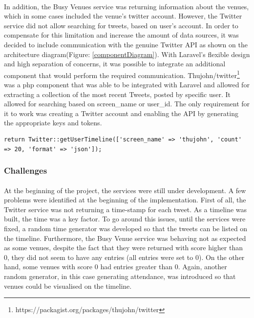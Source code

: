 \documentclass{l4proj}
\begin{document}
\paragraph{}
In addition, the Busy Venues service was returning information about the venues, which in some cases included the venue's twitter account. However, the Twitter service did not allow searching for tweets, based on user's account. In order to compensate for this limitation and increase the amount of data sources, it was decided to include communication with the genuine Twitter API as shown on the architecture diagram(Figure: \ref{componentDiagram}). With Laravel's flexible design and high separation of concerns, it was possible to integrate an additional component that would perform the required communication. Thujohn/twitter\footnote{https://packagist.org/packages/thujohn/twitter} was a php component that was able to be integrated with Laravel and allowed for extracting a collection of the most recent Tweets, posted by specific user. It allowed for searching based on screen\_name or user\_id. The only requirement for it to work was creating a Twitter account and enabling the API by generating the appropriate keys and tokens. 
\begin{lstlisting}
return Twitter::getUserTimeline(['screen_name' => 'thujohn', 'count' => 20, 'format' => 'json']);
\end{lstlisting}

\subsubsection{Challenges}
\paragraph{}
At the beginning of the project, the services were still under development. A few problems were identified at the beginning of the implementation. First of all, the Twitter service was not returning a time-stamp for each tweet. As a timeline was built, the time was a key factor. To go around this issues, until the services were fixed, a random time generator was developed so that the tweets can be listed on the timeline. Furthermore, the Busy Venue service was behaving not as expected as some venues, despite the fact that they were returned with score higher than 0, they did not seem to have any entries (all entries were set to 0). On the other hand, some venues with score 0 had entries greater than 0. Again, another random generator, in this case generating attendance, was introduced so that venues could be visualised on the timeline. 
\end{document}
